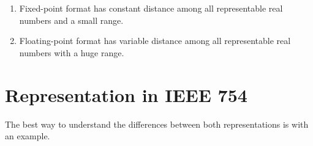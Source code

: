 

\begin{IN}
\begin{enumerate}
\item Fixed-point format has constant distance among all representable real numbers and a small range. 
\item Floating-point format has variable distance among all representable real numbers with a huge range.  
\end{enumerate}
\end{IN}




\newpage 
\section{Representation in IEEE 754}



The best way to understand the differences between both representations is with an example. 


